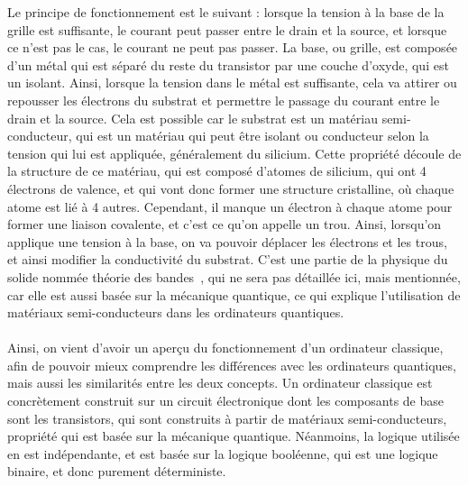 Le principe de fonctionnement est le suivant : lorsque la tension à la base de la grille est suffisante, le courant peut
passer entre le drain et la source, et lorsque ce n'est pas le cas, le courant ne peut pas passer.
La base, ou grille, est composée d'un métal qui est séparé du reste du transistor par une couche d'oxyde,
qui est un isolant.
Ainsi, lorsque la tension dans le métal est suffisante, cela va attirer ou repousser les électrons du substrat
et permettre le passage du courant entre le drain et la source.
Cela est possible car le substrat est un matériau semi-conducteur, qui est un matériau qui peut être isolant
ou conducteur selon la tension qui lui est appliquée, généralement du silicium.
Cette propriété découle de la structure de ce matériau, qui est composé d'atomes de silicium, qui ont 4 électrons
de valence, et qui vont donc former une structure cristalline, où chaque atome est lié à 4 autres.
Cependant, il manque un électron à chaque atome pour former une liaison covalente, et c'est ce qu'on appelle
un trou.
Ainsi, lorsqu'on applique une tension à la base, on va pouvoir déplacer les électrons et les trous, et ainsi
modifier la conductivité du substrat.
C'est une partie de la physique du solide nommée théorie des bandes~\cite{wiki:theo-bandes}, qui ne sera pas détaillée ici, mais mentionnée,
car elle est aussi basée sur la mécanique quantique, ce qui explique l'utilisation de matériaux semi-conducteurs
dans les ordinateurs quantiques.\\ \\
Ainsi, on vient d'avoir un aperçu du fonctionnement d'un ordinateur classique, afin de pouvoir mieux comprendre
les différences avec les ordinateurs quantiques, mais aussi les similarités entre les deux concepts.
Un ordinateur classique est concrètement construit sur un circuit électronique dont les composants de base sont
les transistors, qui sont construits à partir de matériaux semi-conducteurs, propriété qui est basée sur la
mécanique quantique.
Néanmoins, la logique utilisée en est indépendante, et est basée sur la logique booléenne, qui est une logique
binaire, et donc purement déterministe.
